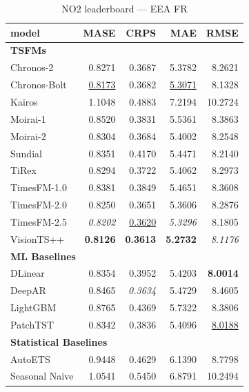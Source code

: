 \begin{table}[H]
\caption{NO2 leaderboard --- EEA FR}
\centering
\begin{small}
\begin{tabular}{lrrrr}
\toprule
model & MASE & CRPS & MAE & RMSE \\
\midrule
\multicolumn{5}{l}{\textbf{TSFMs}} \\
Chronos-2 & 0.8271 & 0.3687 & 5.3782 & 8.2621 \\
Chronos-Bolt & \underline{0.8173} & 0.3682 & \underline{5.3071} & 8.1328 \\
Kairos & 1.1048 & 0.4883 & 7.2194 & 10.2724 \\
Moirai-1 & 0.8520 & 0.3831 & 5.5361 & 8.3863 \\
Moirai-2 & 0.8304 & 0.3684 & 5.4002 & 8.2548 \\
Sundial & 0.8351 & 0.4170 & 5.4471 & 8.2140 \\
TiRex & 0.8294 & 0.3722 & 5.4062 & 8.2973 \\
TimesFM-1.0 & 0.8381 & 0.3849 & 5.4651 & 8.3608 \\
TimesFM-2.0 & 0.8250 & 0.3651 & 5.3606 & 8.2876 \\
TimesFM-2.5 & \textit{0.8202} & \underline{0.3620} & \textit{5.3296} & 8.1805 \\
VisionTS++ & \textbf{0.8126} & \textbf{0.3613} & \textbf{5.2732} & \textit{8.1176} \\
\midrule
\multicolumn{5}{l}{\textbf{ML Baselines}} \\
DLinear & 0.8354 & 0.3952 & 5.4203 & \textbf{8.0014} \\
DeepAR & 0.8465 & \textit{0.3634} & 5.4729 & 8.4605 \\
LightGBM & 0.8765 & 0.4369 & 5.7322 & 8.3806 \\
PatchTST & 0.8342 & 0.3836 & 5.4096 & \underline{8.0188} \\
\midrule
\multicolumn{5}{l}{\textbf{Statistical Baselines}} \\
AutoETS & 0.9448 & 0.4629 & 6.1390 & 8.7798 \\
Seasonal Naive & 1.0541 & 0.5450 & 6.8791 & 10.2494 \\
\bottomrule
\end{tabular}
\end{small}
\end{table}